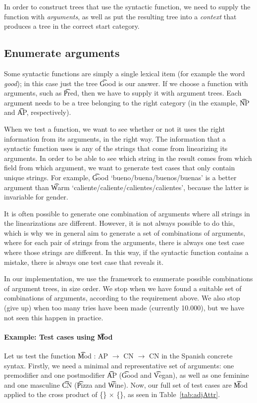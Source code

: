 In order to construct trees that use the syntactic function, we need
to supply the function with \emph{arguments}, as well as put the resulting tree
into a \emph{context} that produces a tree in the correct start
category.

\subsection{Enumerate arguments} Some syntactic functions are
simply a single lexical item (for example the word \emph{good}); in
this case just the tree \t{Good} is our answer.
If we choose a function with arguments, such as \t{Pred}, then we have
to supply it with argument trees. Each argument needs to be a
tree belonging to the right category (in the example, \t{NP} and
\t{AP}, respectively). 

When we test a function, we want to see whether or not it uses the
right information from its arguments, in the right way. The
information that a syntactic function uses is any of the strings that
come from linearizing its arguments. In order to be able to see which
string in the result comes from which field from which argument, we
want to generate test cases that only contain unique strings.
For example, \t{Good} `bueno/buena/buenos/buenas' is a
better argument than \t{Warm} `caliente/caliente/calientes/calientes',
because the latter is invariable for gender.

It is often possible to generate one combination of arguments where
all strings in the linearizations are different. However, it is not
always possible to do this, which is why we in general aim to generate
a set of combinations of arguments, where for each pair of strings
from the arguments, there is always one test case where those strings
are different. In this way, if the syntactic function contains a
mistake, there is always one test case that reveals it.

In our implementation, we use the \feat{} framework \cite{feat} to enumerate possible combinations of argument trees, in size order. We stop when we have found a suitable set of combinations of arguments, according to the requirement above. We also stop (give up) when too many tries have been made (currently 10.000), but we have not seen this happen in practice.

\paragraph{Example: Test cases using \t{Mod}} Let us test the function
\t{Mod : AP $\rightarrow$ CN $\rightarrow$ CN} in the Spanish
concrete syntax.
Firstly, we need a minimal and representative set of arguments:
one premodifier and one postmodifier \t{AP} (\t{Good} and
\t{Vegan}), as well as one feminine and one masculine
\t{CN} (\t{Pizza} and \t{Wine}). Now, our full set of test cases are
\t{Mod} applied to the cross product of \{\} $\times$ \{\}, as seen in Table~\ref{tab:adjAttr}.

